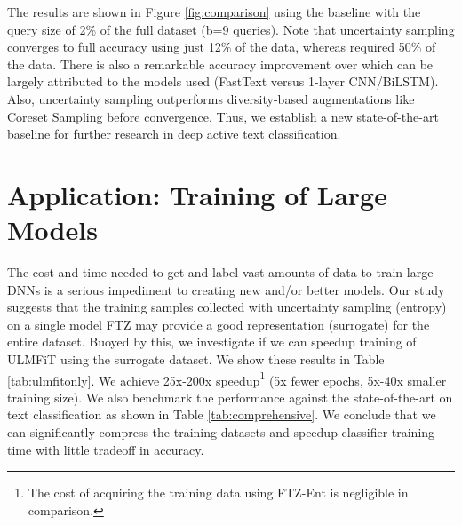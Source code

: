 \documentclass[11pt,a4paper]{article}
\begin{document}
\begin{table}[t]
\centering
{}
\caption{ULMFiT: Resulting sample  compared to reported accuracies in \cite{howard2018universal} (\%dataset in brackets). We observe that using our cheaply obtained compressed datasets, we can achieve similar accuracies with 25x-200x speedup (5x less epochs, 5x-40x less data). Transferability to other models is evidence of the generalizability of the subset collected using FTZ to other deep models.}
\label{tab:ulmfitonly}
\end{table}
The results are shown in Figure \ref{fig:comparison} using the baseline with the query size of 2\% of the full dataset (b=9 queries). Note that uncertainty sampling converges to full accuracy using just 12\% of the data, whereas \cite{siddhant2018deep} required 50\% of the data. There is also a remarkable accuracy improvement over \cite{siddhant2018deep} which can be largely attributed to the models used (FastText versus 1-layer CNN/BiLSTM). Also, uncertainty sampling outperforms diversity-based augmentations like Coreset Sampling \cite{sener2018active} before convergence. Thus, we establish a new state-of-the-art baseline for further research in deep active text classification.

\section{Application: Training of Large Models}
\label{sec:implications}

The cost and time needed to get and label vast amounts of data to train large DNNs is a serious impediment to creating new and/or better models. Our study suggests that the training samples collected with uncertainty sampling (entropy) on a single model FTZ may provide a good representation (surrogate) for the entire dataset. Buoyed by this, we investigate if we can speedup training of ULMFiT \cite{howard2018universal} using the surrogate dataset. We show these results in Table \ref{tab:ulmfitonly}. We achieve 25x-200x speedup\footnote{The cost of acquiring the training data using FTZ-Ent is negligible in comparison.} (5x fewer epochs, 5x-40x smaller training size). We also benchmark the performance against the state-of-the-art on text classification as shown in Table \ref{tab:comprehensive}. We conclude that we can significantly compress the training datasets and speedup classifier training time with little tradeoff in accuracy.
\end{document}
